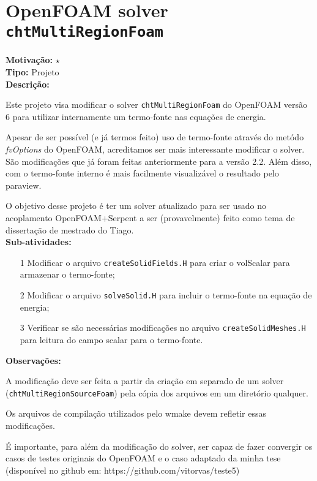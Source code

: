 \chapter{OpenFOAM solver \texttt{chtMultiRegionFoam}}

\textbf{Motivação:} $\star$\\

\textbf{Tipo:} Projeto\\

\textbf{Descrição:}

Este projeto visa modificar o solver \texttt{chtMultiRegionFoam} do 
OpenFOAM versão 6 para utilizar internamente um termo-fonte nas equações 
de energia.

Apesar de ser possível (e já termos feito) uso de termo-fonte através do 
metódo \textit{fvOptions} do OpenFOAM, acreditamos ser mais interessante 
modificar o solver. São modificações que já foram feitas anteriormente 
para a versão 2.2. Além disso, com o termo-fonte interno é mais facilmente 
visualizável o resultado pelo paraview.

O objetivo desse projeto é ter um solver atualizado para ser usado no acoplamento 
OpenFOAM+Serpent a ser (provavelmente) feito como tema de dissertação de mestrado 
do Tiago.\\

\textbf{Sub-atividades:}

\begin{itemize}
	\item[1] Modificar o arquivo \texttt{createSolidFields.H} para criar o volScalar para armazenar o termo-fonte; 
	\item[2] Modificar o arquivo \texttt{solveSolid.H} para incluir o termo-fonte na equação de energia;
	\item[3] Verificar se são necessárias modificações no arquivo \texttt{createSolidMeshes.H} para leitura do campo scalar para o termo-fonte.
\end{itemize}

\textbf{Observações:}

A modificação deve ser feita a partir da criação em separado de um solver 
(\texttt{chtMultiRegionSourceFoam}) pela cópia dos arquivos em um diretório qualquer.

Os arquivos de compilação utilizados pelo wmake devem refletir essas modificações.

É importante, para além da modificação do solver, ser capaz de fazer convergir os 
casos de testes originais do OpenFOAM e o caso adaptado da minha tese (disponível 
no github em: https://github.com/vitorvas/teste5)

